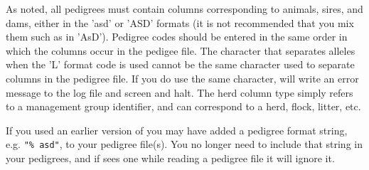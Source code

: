 As noted, all pedigrees must contain columns corresponding to animals, sires, and dams, either in the 'asd' or 'ASD' formats (it is not recommended that you mix them such as in 'AsD').  Pedigree codes should be entered in the same order in which the columns occur in the pedigee file.  The character that separates alleles when the 'L' format code is used cannot be the same character used to separate columns in the pedigree file.  If you do use the same character, \PyPedal{} will write an error message to the log file and screen and halt.  The herd column type simply refers to a management group identifier, and can
correspond to a herd, flock, litter, etc.

If you used an earlier version of \PyPedal{} you may have added a pedigree format string, e.g. \texttt{"\% asd"}, to your pedigree file(s).  You no longer need to include that string in your pedigrees, and if \PyPedal{} sees one while reading a pedigree file it will ignore it.

